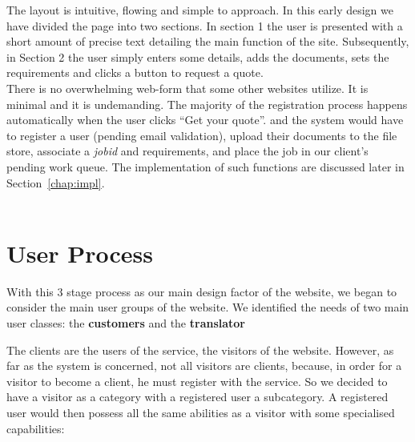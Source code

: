 \documentclass{l3proj}
\begin{document}
The layout is intuitive, flowing and simple to approach. In this early design we
have divided the page into two sections. In section 1 the user is presented with
a short amount of precise text detailing the main function of the site.
Subsequently, in Section 2 the user simply enters some details, adds the
documents, sets the requirements and clicks a button to request a quote. \\There
is no overwhelming web-form that some other websites utilize. It is minimal and
it is undemanding. The majority of the registration process happens
automatically when the user clicks ``Get your quote''. and the system would have
to register a user (pending email validation), upload their documents to the
file store, associate a \textit{jobid} and requirements, and place the job in
our client's pending work queue. The implementation of such functions are
discussed later in Section~\ref{chap:impl}.\\
\\


\section{User Process}
\label{sect:user-process}
With this 3 stage process as our main design factor of the website, we began to
consider the main user groups of the website. We identified the needs of two
main user classes: the \textbf{customers} and the \textbf{translator}

The clients are the users of the service, the visitors of the website. However,
as far as the system is concerned, not all visitors are clients, because, in
order for a visitor to become a client, he must register with the service. So we
decided to have a visitor as a category with a registered user a subcategory. A
registered user would then possess all the same abilities as a visitor with some
specialised capabilities:
\end{document}
